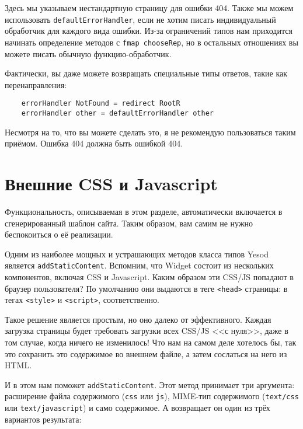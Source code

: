 Здесь мы указываем нестандартную страницу для ошибки 404. Также мы можем
использовать \lstinline!defaultErrorHandler!, если не хотим писать
индивидуальный обработчик для каждого вида ошибки. Из-за ограничений типов нам
приходится начинать определение методов с \lstinline!fmap chooseRep!, но в
остальных отношениях вы можете писать обычную функцию-обработчик.

Фактически, вы даже можете возвращать специальные типы ответов, такие как
перенаправления:

\begin{lstlisting}
    errorHandler NotFound = redirect RootR
    errorHandler other = defaultErrorHandler other
\end{lstlisting}

\begin{remark}
    Несмотря на то, что вы можете сделать это, я не рекомендую пользоваться
    таким приёмом. Ошибка 404 должна быть ошибкой 404.
\end{remark}

\section {Внешние CSS и Javascript}

\begin{remark}
    Функциональность, описываемая в этом разделе, автоматически включается в
    сгенерированный шаблон сайта. Таким образом, вам самим не нужно
    беспокоиться о её реализации.
\end{remark}

Одним из наиболее мощных и устрашающих методов класса типов Yesod является
\lstinline!addStaticContent!. Вспомним, что Widget состоит из нескольких
компонентов, включая CSS и Javascript. Каким образом эти CSS/JS попадают в
браузер пользователя? По умолчанию они выдаются в теге \lstinline!<head>!
страницы: в тегах \lstinline!<style>! и \lstinline!<script>!, соответственно.

Такое решение является простым, но оно далеко от эффективного. Каждая загрузка
страницы будет требовать загрузки всех CSS/JS <<с нуля>>, даже в том случае,
когда ничего не изменилось! Что нам на самом деле хотелось бы, так это
сохранить это содержимое во внешнем файле, а затем сослаться на него из HTML.

И в этом нам поможет \lstinline!addStaticContent!. Этот метод принимает три
аргумента: расширение файла содержимого (\lstinline!css! или \lstinline!js!),
MIME-тип содержимого (\lstinline!text/css! или \lstinline!text/javascript!) и
само содержимое. А возвращает он один из трёх вариантов результата:

